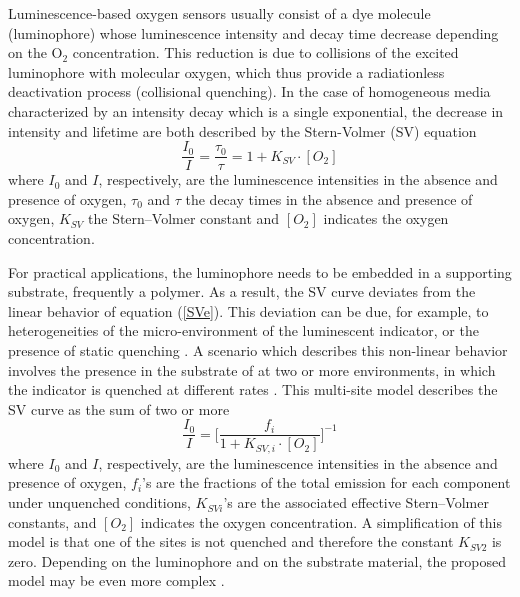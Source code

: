 \documentclass[9pt,twocolumn,twoside,pdftex]{optica}
\begin{document}
Luminescence-based oxygen sensors usually consist of a dye molecule (luminophore) whose luminescence intensity and decay time decrease depending on the O$_2$ concentration. This reduction is due to collisions of the excited luminophore with molecular oxygen, which thus provide a radiationless deactivation process (collisional quenching). 
In the case of homogeneous media characterized by an intensity decay which is a single exponential, the decrease in intensity and lifetime are both described by the Stern-Volmer (SV) equation \cite{Lakowicz2006}
\begin{equation}
\frac{I_0}{I}=\frac{\tau_0}{\tau}=1+K_{SV} \cdot \left[O_2\right]
\label{SVe}
\end{equation}
where $I_0$ and $I$, respectively, are the luminescence intensities in the absence and presence of oxygen, $\tau_0$ and $\tau$ the decay times in the absence and presence of oxygen, $K_{SV}$ the Stern–Volmer constant and $\left[O_2\right]$ indicates the oxygen concentration.

For practical applications, the luminophore needs to be embedded in a supporting substrate, frequently a polymer. As a result, the SV curve deviates from the linear behavior of equation (\ref{SVe}). This deviation can be due, for example, to heterogeneities of the micro-environment of the luminescent indicator, or the presence of static quenching \cite{Wang2014}. A scenario which describes this non-linear behavior involves the presence in the substrate of at two or more environments, in which the indicator is quenched at different rates \cite{Carraway1991,Demas1995}. This multi-site model describes the SV curve as the sum of two or more
\begin{equation}
\frac{I_0}{I}=\bigg[
\frac{f_i}{1+K_{SV,i} \cdot \left[O_2\right]}
\bigg]^{-1}
\label{SVe2}
\end{equation}
where $I_0$ and $I$, respectively, are the luminescence intensities in the absence and presence of oxygen, $f_i$'s are the fractions of the total emission for each component under unquenched conditions, $K_{SVi}$'s are the associated effective Stern–Volmer constants, and $\left[O_2\right]$ indicates the oxygen concentration. A simplification of this model is that one of the sites is not quenched and therefore the constant $K_{SV2}$ is zero.
 Depending on the luminophore and on the substrate material, the proposed model may be even more complex \cite{Demas1995,Hartmann1995,Mills1999}.
\end{document}
